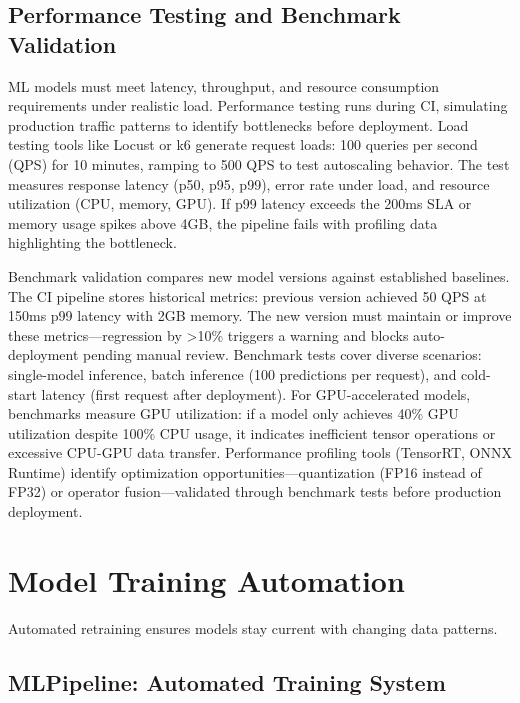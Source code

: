 \subsection{Performance Testing and Benchmark Validation}

ML models must meet latency, throughput, and resource consumption requirements under realistic load. Performance testing runs during CI, simulating production traffic patterns to identify bottlenecks before deployment. Load testing tools like Locust or k6 generate request loads: 100 queries per second (QPS) for 10 minutes, ramping to 500 QPS to test autoscaling behavior. The test measures response latency (p50, p95, p99), error rate under load, and resource utilization (CPU, memory, GPU). If p99 latency exceeds the 200ms SLA or memory usage spikes above 4GB, the pipeline fails with profiling data highlighting the bottleneck.

Benchmark validation compares new model versions against established baselines. The CI pipeline stores historical metrics: previous version achieved 50 QPS at 150ms p99 latency with 2GB memory. The new version must maintain or improve these metrics---regression by >10\% triggers a warning and blocks auto-deployment pending manual review. Benchmark tests cover diverse scenarios: single-model inference, batch inference (100 predictions per request), and cold-start latency (first request after deployment). For GPU-accelerated models, benchmarks measure GPU utilization: if a model only achieves 40\% GPU utilization despite 100\% CPU usage, it indicates inefficient tensor operations or excessive CPU-GPU data transfer. Performance profiling tools (TensorRT, ONNX Runtime) identify optimization opportunities---quantization (FP16 instead of FP32) or operator fusion---validated through benchmark tests before production deployment.

\section{Model Training Automation}

Automated retraining ensures models stay current with changing data patterns.

\subsection{MLPipeline: Automated Training System}

